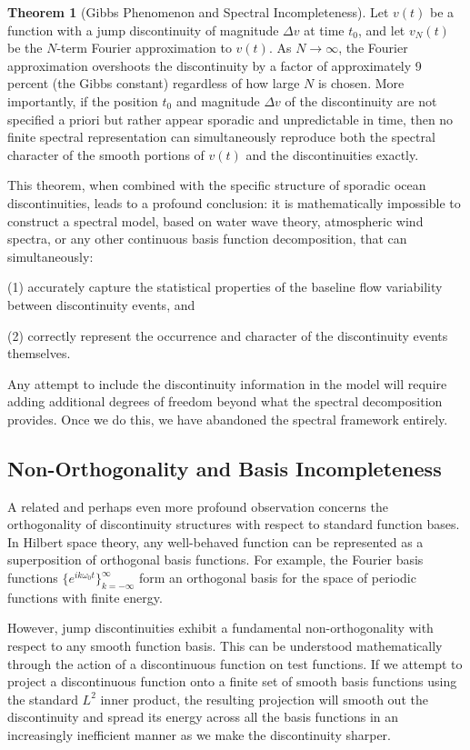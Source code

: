 ﻿\documentclass[a4paper,11pt]{article}
\theoremstyle{definition}
\newtheorem{theorem}{Theorem}
\begin{document}
\begin{theorem}[Gibbs Phenomenon and Spectral Incompleteness]
Let $v(t)$ be a function with a jump discontinuity of magnitude $\Delta v$ at time $t_0$, and let $v_N(t)$ be the $N$-term Fourier approximation to $v(t)$. As $N \to \infty$, the Fourier approximation overshoots the discontinuity by a factor of approximately 9 percent (the Gibbs constant) regardless of how large $N$ is chosen. More importantly, if the position $t_0$ and magnitude $\Delta v$ of the discontinuity are not specified a priori but rather appear sporadic and unpredictable in time, then no finite spectral representation can simultaneously reproduce both the spectral character of the smooth portions of $v(t)$ and the discontinuities exactly.
\end{theorem}

This theorem, when combined with the specific structure of sporadic ocean discontinuities, leads to a profound conclusion: it is mathematically impossible to construct a spectral model, based on water wave theory, atmospheric wind spectra, or any other continuous basis function decomposition, that can simultaneously:

(1) accurately capture the statistical properties of the baseline flow variability between discontinuity events, and

(2) correctly represent the occurrence and character of the discontinuity events themselves.

Any attempt to include the discontinuity information in the model will require adding additional degrees of freedom beyond what the spectral decomposition provides. Once we do this, we have abandoned the spectral framework entirely.

\subsection{Non-Orthogonality and Basis Incompleteness}

A related and perhaps even more profound observation concerns the orthogonality of discontinuity structures with respect to standard function bases. In Hilbert space theory, any well-behaved function can be represented as a superposition of orthogonal basis functions. For example, the Fourier basis functions $\{e^{i k \omega_0 t}\}_{k=-\infty}^{\infty}$ form an orthogonal basis for the space of periodic functions with finite energy.

However, jump discontinuities exhibit a fundamental non-orthogonality with respect to any smooth function basis. This can be understood mathematically through the action of a discontinuous function on test functions. If we attempt to project a discontinuous function onto a finite set of smooth basis functions using the standard $L^2$ inner product, the resulting projection will smooth out the discontinuity and spread its energy across all the basis functions in an increasingly inefficient manner as we make the discontinuity sharper.
\end{document}
